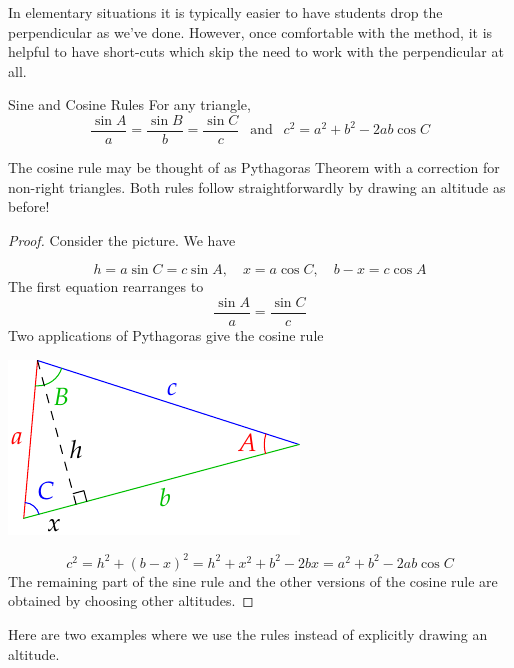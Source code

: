 In elementary situations it is typically easier to have students drop the perpendicular as we've done. However, once comfortable with the method, it is helpful to have short-cuts which skip the need to work with the perpendicular at all.


\begin{thm}{Sine and Cosine Rules}{}
For any triangle,
\[\frac{\sin A}a=\frac{\sin B}b=\frac{\sin C}c\ \ \text{ and }\ \ c^2=a^2+b^2-2ab\cos C\]
\end{thm}

The cosine rule may be thought of as Pythagoras Theorem with a correction for non-right triangles. Both rules follow straightforwardly by drawing an altitude as before!

\begin{proof}
Consider the picture. We have\par
\begin{minipage}[t]{0.6\linewidth}\vspace{-11pt}
\[h=a\sin C=c\sin A,\quad x=a\cos C,\quad b-x=c\cos A\]
The first equation rearranges to
\[\frac{\sin A}a=\frac{\sin C}c\]
Two applications of Pythagoras give the cosine rule
\end{minipage}\hfill\begin{minipage}[t]{0.39\linewidth}\vspace{-5pt}
\flushright\includegraphics{sinerule}
\end{minipage}\smallbreak
\[c^2=h^2+(b-x)^2=h^2+x^2+b^2-2bx =a^2+b^2-2ab\cos C\]
The remaining part of the sine rule and the other versions of the cosine rule are obtained by choosing other altitudes.
\end{proof}


Here are two examples where we use the rules instead of explicitly drawing an altitude.

